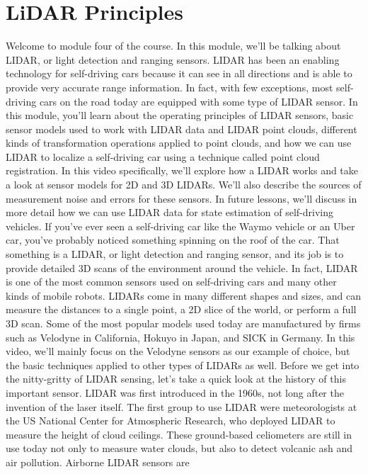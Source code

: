 \section{LiDAR Principles}
\label{lidar_principles}
Welcome to module four of the course. In this module, we'll
be talking about LIDAR, or light detection and ranging sensors. LIDAR has been an enabling technology
for self-driving cars because it can see in all directions and is able to provide very accurate range information. In fact, with few exceptions, most self-driving cars
on the road today are equipped with some type of LIDAR sensor. In this module, you'll learn about the operating principles
of LIDAR sensors, basic sensor models used to work with
LIDAR data and LIDAR point clouds, different kinds of transformation
operations applied to point clouds, and how we can use LIDAR to localize a self-driving car using a technique
called point cloud registration. In this video specifically, we'll explore how a LIDAR works and take a look at sensor models
for 2D and 3D LIDARs. We'll also describe the sources of measurement noise and
errors for these sensors. In future lessons, we'll discuss
in more detail how we can use LIDAR data for state estimation
of self-driving vehicles. If you've ever seen
a self-driving car like the Waymo vehicle or an Uber car, you've probably noticed something
spinning on the roof of the car. That something is a LIDAR, or light detection and ranging sensor, and its job is to provide detailed 3D scans of
the environment around the vehicle. In fact, LIDAR is one of
the most common sensors used on self-driving cars and
many other kinds of mobile robots. LIDARs come in many
different shapes and sizes, and can measure the
distances to a single point, a 2D slice of the world, or perform a full 3D scan. Some of the most popular
models used today are manufactured by firms such
as Velodyne in California, Hokuyo in Japan, and SICK in Germany. In this video, we'll mainly focus on the Velodyne sensors as
our example of choice, but the basic techniques applied
to other types of LIDARs as well. Before we get into
the nitty-gritty of LIDAR sensing, let's take a quick look at
the history of this important sensor. LIDAR was first introduced in the 1960s, not long after the invention
of the laser itself. The first group to use
LIDAR were meteorologists at the US National Center
for Atmospheric Research, who deployed LIDAR to measure
the height of cloud ceilings. These ground-based
celiometers are still in use today not only to
measure water clouds, but also to detect volcanic ash
and air pollution. Airborne LIDAR sensors are
